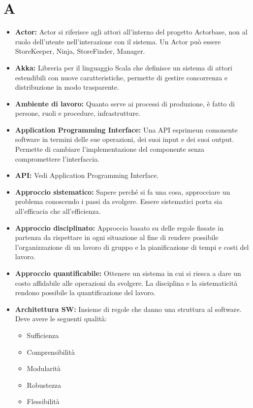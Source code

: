 \documentclass[a4paper]{article}
\begin{document}
	\section{A}
		\begin{itemize}
			\item \textbf{Actor:} Actor si riferisce agli attori all'interno del progetto Actorbase, 
			non al ruolo dell'utente nell'interazione con il sistema. Un Actor può essere StoreKeeper, 
			Ninja, StoreFinder, Manager.
			\item \textbf{Akka:} Libreria per il linguaggio Scala che definisce un sistema di attori estendibili con nuove caratteristiche, permette di gestire concorrenza e distribuzione in modo trasparente.
			\item \textbf{Ambiente di lavoro:} Quanto serve ai processi di produzione, è fatto di persone, 
			ruoli e procedure, infrastrutture.
			\item \textbf{Application Programming Interface:} Una API esprimeun comonente software in termini delle sue operazioni, dei suoi input e dei suoi output. Permette di cambiare l'implementazione del componente senza compromettere l'interfaccia.
			\item \textbf{API:} Vedi Application Programming Interface.
			\item \textbf{Approccio sistematico:} Sapere perché si fa una cosa, approcciare un problema 
			conoscendo i passi da svolgere. Essere sistematici porta sia all’efficacia che all’efficienza.
			\item \textbf{Approccio disciplinato:} Approccio basato su delle regole fissate in partenza da 
			rispettare in ogni situazione al fine di rendere possibile l’organizzazione di un lavoro di gruppo 
			e la pianificazione di tempi e costi del lavoro.
			\item \textbf{Approccio quantificabile:} Ottenere un sistema in cui si riesca a dare un costo 
			affidabile alle operazioni da svolgere. La disciplina e la sistematicità rendono possibile la 
			quantificazione del lavoro.
			\item \textbf{Architettura SW:} Insieme di regole che danno una struttura al software. Deve avere le seguenti qualità:
			\begin{itemize}
				\item  Sufficienza
				\item  Comprensibilità
				\item  Modularità
				\item  Robustezza 
				\item  Flessibilità

\end{itemize}
\end{itemize}
\end{document}
